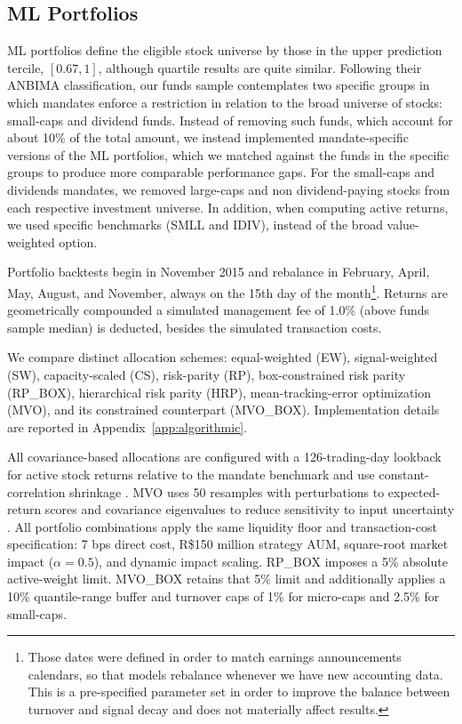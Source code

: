 \documentclass[preprint,12pt,authoryear]{elsarticle}
\begin{document}
\subsection{ML Portfolios}

ML portfolios define the eligible stock universe by those in the upper prediction tercile, $[0.67,1]$, although quartile results are quite similar. Following their ANBIMA classification, our funds sample contemplates two specific groups in which mandates enforce a restriction in relation to the broad universe of stocks: small-caps and dividend funds. Instead of removing such funds, which account for about 10\% of the total amount, we instead implemented mandate-specific versions of the ML portfolios, which we matched against the funds in the specific groups to produce more comparable performance gaps. For the small-caps and dividends mandates, we removed large-caps and non dividend-paying stocks from each respective investment universe. In addition, when computing active returns, we used specific benchmarks (SMLL and IDIV), instead of the broad value-weighted option.

Portfolio backtests begin in November 2015 and rebalance in February, April, May, August, and November, always on the 15th day of the month\footnote{Those dates were defined in order to match earnings announcements calendars, so that models rebalance whenever we have new accounting data. This is a pre-specified parameter set in order to improve the balance between turnover and signal decay and does not materially affect results.}. Returns are geometrically compounded a simulated management fee of 1.0\% (above funds sample median) is deducted, besides the simulated transaction costs.

We compare distinct allocation schemes: equal-weighted (EW), signal-weighted (SW), capacity-scaled (CS), risk-parity (RP), box-constrained risk parity (RP\_BOX), hierarchical risk parity (HRP), mean-tracking-error optimization (MVO), and its constrained counterpart (MVO\_BOX). Implementation details are reported in Appendix~\ref{app:algorithmic}.

All covariance-based allocations are configured with a 126-trading-day lookback for active stock returns relative to the mandate benchmark and use constant-correlation shrinkage \citep{ledoitwolf2003,ledoitwolf2004}. MVO uses 50 resamples with perturbations to expected-return scores and covariance eigenvalues to reduce sensitivity to input uncertainty \citep{michaud1989}. All portfolio combinations apply the same liquidity floor and transaction-cost specification: 7 bps direct cost, R\$150 million strategy AUM, square-root market impact ($\alpha=0.5$), and dynamic impact scaling. RP\_BOX imposes a 5\% absolute active-weight limit. MVO\_BOX retains that 5\% limit and additionally applies a 10\% quantile-range buffer and turnover caps of 1\% for micro-caps and 2.5\% for small-caps.
\end{document}
